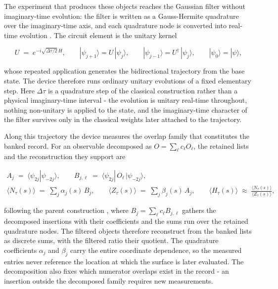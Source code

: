 The experiment that produces these objects reaches the Gaussian filter without imaginary-time evolution: the filter is written as a Gauss-Hermite quadrature over the imaginary-time axis, and each quadrature node is converted into real-time evolution \cite{leamer2024emulation,mccaul2025snacks}. The circuit element is the unitary kernel
\begin{widetext}
\begin{equation}\label{def:itqde-unitary-kernel}
U \;=\; e^{-i\sqrt{\Delta\tau/2}\,H}, \qquad |\psi_{j+1}\rangle = U\,|\psi_j\rangle, \qquad |\psi_{j-1}\rangle = U^{\dagger}\,|\psi_j\rangle, \qquad |\psi_0\rangle = |\psi\rangle,
\end{equation}
\end{widetext}
whose repeated application generates the bidirectional trajectory from the base state. The device therefore runs ordinary unitary evolutions of a fixed elementary step. Here $\Delta\tau$ is a quadrature step of the classical construction rather than a physical imaginary-time interval - the evolution is unitary real-time throughout, nothing non-unitary is applied to the state, and the imaginary-time character of the filter survives only in the classical weights later attached to the trajectory.

Along this trajectory the device measures the overlap family that constitutes the banked record. For an observable decomposed as $O = \sum_\ell c_\ell O_\ell$, the retained lists and the reconstruction they support are
\begin{widetext}
\[
\begin{gathered}
A_j \;=\; \langle \psi_{2j} | \psi_{-2j} \rangle, \qquad B_{j,\ell} \;=\; \langle \psi_{2j} |\, O_\ell\, | \psi_{-2j} \rangle,\\[2pt]
\langle N_\tau(s) \rangle \;=\; \sum_{j} \alpha_j(s)\, B_j, \qquad \langle Z_\tau(s) \rangle \;=\; \sum_{j} \beta_j(s)\, A_j, \qquad \langle H_\tau(s) \rangle \;\approx\; \frac{\langle N_\tau(s) \rangle}{\langle Z_\tau(s) \rangle},
\end{gathered}
\]
\end{widetext}
following the parent construction \cite{mccaul2025snacks}, where $B_j = \sum_\ell c_\ell B_{j,\ell}$ gathers the decomposed insertions with their coefficients and the sums run over the retained quadrature nodes. The filtered objects therefore reconstruct from the banked lists as discrete sums, with the filtered ratio their quotient. The quadrature coefficients $\alpha_j$ and $\beta_j$ carry the entire coordinate dependence, so the measured entries never reference the location at which the surface is later evaluated. The decomposition also fixes which numerator overlaps exist in the record - an insertion outside the decomposed family requires new measurements.

